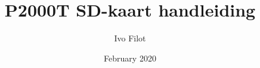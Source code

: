 \documentclass[11pt,fleqn,twoside,openright]{extbook}
\title{P2000T SD-kaart handleiding}
\author{Ivo Filot}
\date{February 2020}
\begin{document}
\mainmatter

\dominitoc
\tableofcontents






\appendix
\renewcommand\chaptername{Appendix }


\end{document}

